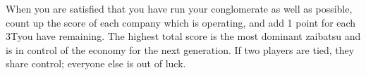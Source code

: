 \documentclass[]{article}
\newcommand{\tyen}{T\textyen}
\begin{document}
When you are satisfied that you have run your conglomerate as well as possible, count up the score of each company which is operating, and %
add 1 point for each 3\tyen you have remaining. The highest total score is the most dominant zaibatsu and is in control of the economy for the next generation. If two players are tied, they share control; everyone else is out of luck.



\end{document}
